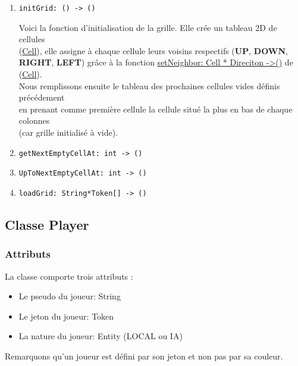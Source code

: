 \documentclass[11pt]{article}
\begin{document}
\begin{enumerate}
\item \texttt{initGrid: () -> ()}
\label{sec:orgb89997f}

Voici la fonction d'initialisation de la grille. Elle crée un tableau 2D de cellules\\
(\hyperref[org4b22c5b]{Cell}), elle assigne à chaque cellule leurs voisins respectifs (\textbf{UP}, \textbf{DOWN},\\
\textbf{RIGHT}, \textbf{LEFT}) grâce à la fonction \hyperref[org334d463]{setNeighbor: Cell * Direciton ->()} de (\hyperref[org4b22c5b]{Cell}).\\

Nous remplissons ensuite le tableau des prochaines cellules vides définis précédement\\
en prenant comme première cellule la cellule situé la plus en bas de chaque colonnes\\
(car grille initialisé à vide).\\

\item \texttt{getNextEmptyCellAt: int -> ()}
\label{sec:orgb65b67c}
\item \texttt{UpToNextEmptyCellAt: int -> ()}
\label{sec:org47482a3}
\item \texttt{loadGrid: String*Token[] -> ()}
\label{sec:orgfc1dd12}
\end{enumerate}

\subsection{Classe Player\label{orgeab1eee}}
\label{sec:orga69eb60}
\subsubsection{Attributs}
\label{sec:org27745fa}

La classe comporte trois attributs :\\
\begin{itemize}
\item Le pseudo du joueur: String\\
\item Le jeton du joueur: Token\\
\item La nature du joueur: Entity (LOCAL ou IA)\\
\end{itemize}

Remarquons qu'un joueur est défini par son jeton et non pas par sa couleur.\\
\end{document}
